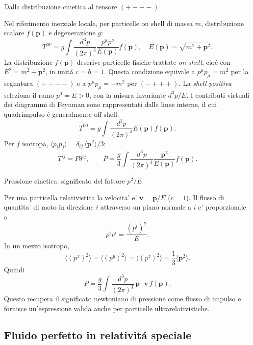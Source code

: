 \begin{frame}[t]{Dalla distribuzione cinetica al tensore $(+---)$}\small\raggedright

Nel riferimento inerziale locale, per particelle on shell di massa $m$, distribuzione scalare $f(\mathbf p)$ e degenerazione $g$:
\[
T^{\mu\nu}=g\int\frac{d^3p}{(2\pi)^3}\frac{p^\mu p^\nu}{E(\mathbf p)}f(\mathbf p),
\quad E(\mathbf p)=\sqrt{m^2+\mathbf p^2}.
\]
La distribuzione \(f(\mathbf p)\) descrive particelle fisiche trattate \emph{on shell}, cio\'e con \(E^2=m^2+\mathbf p^2\), in unit\'a \(c=\hbar=1\). Questa condizione equivale a \(p^\mu p_\mu=m^2\) per la segnatura \((+---)\) e a \(p^\mu p_\mu=-m^2\) per \((-+++)\). La \emph{shell positiva} seleziona il ramo \(p^0=E>0\), con la misura invariante \(d^3p/E\). I contributi virtuali dei diagrammi di Feynman sono rappresentati dalle linee interne, il cui quadrimpulso \'e generalmente off shell.
\[
T^{00}=g\int\frac{d^3p}{(2\pi)^3}E(\mathbf p)f(\mathbf p).
\]
Per $f$ isotropa, $\langle p_ip_j\rangle=\delta_{ij}\,\langle\mathbf p^2\rangle/3$:
\[
T^{ij}=P\delta^{ij},\qquad
P=\frac g3\int\frac{d^3p}{(2\pi)^3}\frac{\mathbf p^2}{E(\mathbf p)}f(\mathbf p).
\]

\end{frame}

\begin{frame}[t]{Pressione cinetica: significato del fattore $p^2/E$}\small\raggedright

Per una particella relativistica la velocita' e' $\mathbf v=\mathbf p/E$ ($c=1$). Il flusso di quantita' di moto in direzione $i$ attraverso un piano normale a $i$ e' proporzionale a
\[
p^iv^i=\frac{(p^i)^2}{E}.
\]
In un mezzo isotropo,
\[
\langle(p^x)^2\rangle=\langle(p^y)^2\rangle
=\langle(p^z)^2\rangle=\frac13\langle\mathbf p^2\rangle.
\]
Quindi
\[
P=\frac g3\int\frac{d^3p}{(2\pi)^3}\,\mathbf p\cdot\mathbf v\,f(\mathbf p).
\]
Questo recupera il significato newtoniano di pressione come flusso di impulso e fornisce un'espressione valida anche per particelle ultrarelativistiche.

\end{frame}

\subsection{Fluido perfetto in relativit\'a speciale}

